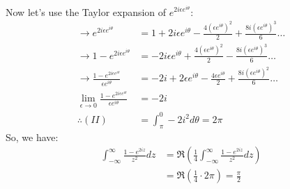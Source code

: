 \begin{example}
\begin{align*}
    \end{align*}
    Now let's use the Taylor expansion of $e^{2i\epsilon e^{i\theta}}$:
    \begin{align*}
        \rightarrow e^{2i\epsilon e^{i\theta}}                                            & = 1 + 2i\epsilon e^{i\theta} - \frac{4(\epsilon e^{i\theta})^2}{2} + \frac{8i(\epsilon e^{i\theta})^3}{6} \ldots \\
        \rightarrow 1 - e^{2i\epsilon e^{i\theta}}                                        & = -2i\epsilon e^{i\theta} + \frac{4(\epsilon e^{i\theta})^2}{2} - \frac{8i(\epsilon e^{i\theta})^3}{6} \ldots    \\
        \rightarrow \frac{1 - e^{2i\epsilon e^{i\theta}}}{\epsilon e^{i\theta}}           & = -2i + 2\epsilon e^{i\theta} - \frac{4\epsilon e^{i\theta}}{2} + \frac{8i(\epsilon e^{i\theta})^2}{6} \ldots    \\
        \lim_{\epsilon \to 0} \frac{1 - e^{2i\epsilon e^{i\theta}}}{\epsilon e^{i\theta}} & = -2i                                                                                                            \\
        \therefore (II)                                                                   & = \int_{\pi}^{0} -2i^2 d\theta = 2\pi
    \end{align*}
    So, we have:
    \begin{align}
        \int_{-\infty}^{\infty} \frac{1 - e^{2iz}}{z^2} dz & = \Re \left( \frac{1}{4} \int_{-\infty}^{\infty} \frac{1 - e^{2iz}}{z^2} dz \right) \\
                                                           & = \Re \left( \frac{1}{4} \cdot 2\pi \right) = \frac{\pi}{2}
    \end{align}
\end{example}

